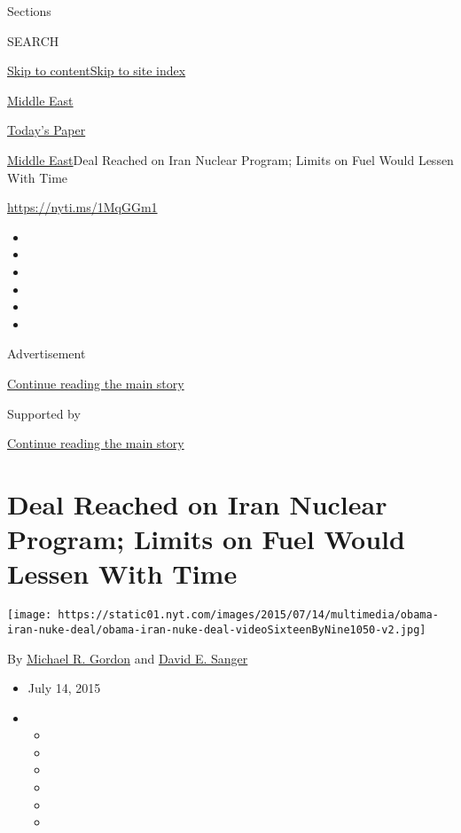 Sections

SEARCH

\protect\hyperlink{site-content}{Skip to
content}\protect\hyperlink{site-index}{Skip to site index}

\href{https://www.nytimes.com/section/world/middleeast}{Middle East}

\href{https://myaccount.nytimes.com/auth/login?response_type=cookie\&client_id=vi}{}

\href{https://www.nytimes.com/section/todayspaper}{Today's Paper}

\href{/section/world/middleeast}{Middle East}\textbar{}Deal Reached on
Iran Nuclear Program; Limits on Fuel Would Lessen With Time

\url{https://nyti.ms/1MqGGm1}

\begin{itemize}
\item
\item
\item
\item
\item
\item
\end{itemize}

Advertisement

\protect\hyperlink{after-top}{Continue reading the main story}

Supported by

\protect\hyperlink{after-sponsor}{Continue reading the main story}

\hypertarget{deal-reached-on-iran-nuclear-program-limits-on-fuel-would-lessen-with-time}{%
\section{Deal Reached on Iran Nuclear Program; Limits on Fuel Would
Lessen With
Time}\label{deal-reached-on-iran-nuclear-program-limits-on-fuel-would-lessen-with-time}}

\texttt{[image: https://static01.nyt.com/images/2015/07/14/multimedia/obama-iran-nuke-deal/obama-iran-nuke-deal-videoSixteenByNine1050-v2.jpg]}

By \href{https://www.nytimes.com/by/michael-r-gordon}{Michael R. Gordon}
and \href{https://www.nytimes.com/by/david-e-sanger}{David E. Sanger}

\begin{itemize}
\item
  July 14, 2015
\item
  \begin{itemize}
  \item
  \item
  \item
  \item
  \item
  \item
  \end{itemize}
\end{itemize}

